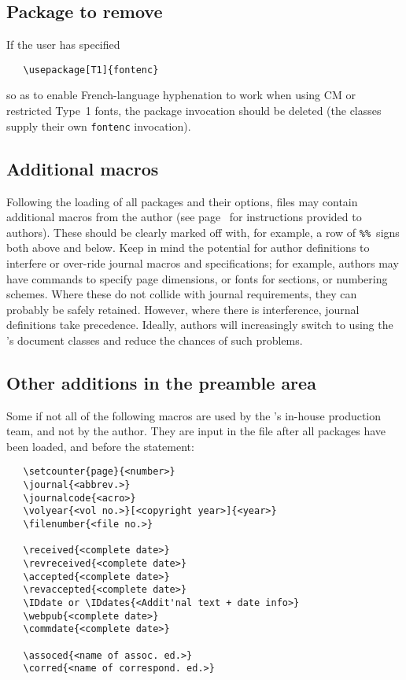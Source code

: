 \newpage


\subsection{Package to remove}

If the user has specified
%
\begin{verbatim}
   \usepackage[T1]{fontenc}
\end{verbatim}
%
so as to enable French-language hyphenation to work when using {\small
CM} or restricted Type~1 fonts, the package invocation should be
deleted (the \NRC{} classes supply their own \verb|fontenc|
invocation).


\subsection{Additional macros}

Following the loading of all packages and their options, files may
contain additional macros from the author (see
page~\pageref{authmacros} for instructions provided to authors). These
should be clearly marked off with, for example, a row of
\verb|%%|~signs both above and below. Keep in mind the potential for
author definitions to interfere or over-ride journal macros and
specifications; for example, authors may have commands to specify page
dimensions, or fonts for sections, or numbering schemes. Where these
do not collide with journal requirements, they can probably be safely
retained. However, where there is interference, journal definitions
take precedence. Ideally, authors will increasingly switch to using
the \NRC's document classes and reduce the chances of such problems.


\subsection{Other additions in the preamble area}

Some if not all of the following macros are used by the \NRC's
in-house production team, and not by the author. They are input in the
file after all packages have been loaded, and before the
\verb|| statement:

\begin{verbatim}
   \setcounter{page}{<number>}
   \journal{<abbrev.>}
   \journalcode{<acro>}
   \volyear{<vol no.>}[<copyright year>]{<year>}
   \filenumber{<file no.>}

   \received{<complete date>}
   \revreceived{<complete date>}
   \accepted{<complete date>}
   \revaccepted{<complete date>}
   \IDdate or \IDdates{<Addit'nal text + date info>}
   \webpub{<complete date>}
   \commdate{<complete date>}
   
   \assoced{<name of assoc. ed.>}
   \corred{<name of correspond. ed.>}
\end{verbatim}

